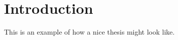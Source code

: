 \hypertarget{Introduction}{}
\chapter*{Introduction}
\label{Chapter:Introduction}

\renewcommand{\thefigure}{I.\arabic{figure}}
\renewcommand{\thetable}{I.\arabic{table}}
\renewcommand{\theequation}{I.\arabic{equation}}


This is an example \cite{Source} of how a nice thesis might look like.

\lipsum[2]


\renewcommand{\thefigure}{\thechapter.\arabic{figure}}
\renewcommand{\thetable}{\thechapter.\arabic{table}}
\renewcommand{\theequation}{\thechapter.\arabic{equation}}
